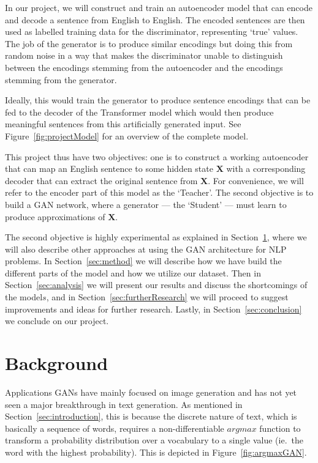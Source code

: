 \documentclass{article}
\begin{document}
In our project, we will construct and train an autoencoder model that can encode
and decode a sentence from English to English. The encoded sentences are then
used as labelled training data for the discriminator, representing `true'
values. The job of the generator is to produce similar encodings but doing this
from random noise in a way that makes the discriminator unable to distinguish
between the encodings stemming from the autoencoder and the encodings stemming
from the generator.

Ideally, this would train the generator to produce sentence encodings that can
be fed to the decoder of the Transformer model which would then produce
meaningful sentences from this artificially generated input. See
Figure~\ref{fig:projectModel} for an overview of the complete model.

This project thus have two objectives: one is to construct a working autoencoder
that can map an English sentence to some hidden state $\mathbf{X}$ with a
corresponding decoder that can extract the original sentence from $\mathbf{X}$.
For convenience, we will refer to the encoder part of this model as the
`Teacher'. The second objective is to build a GAN network, where a generator ---
the `Student' --- must learn to produce approximations of $\mathbf{X}$.

The second objective is highly experimental as explained in
Section~\ref{sec:background}, where we will also describe other approaches at
using the GAN architecture for NLP problems. In Section~\ref{sec:method} we will
describe how we have build the different parts of the model and how we utilize
our dataset. Then in Section~\ref{sec:analysis} we will present our results and
discuss the shortcomings of the model\(s\), and in
Section~\ref{sec:furtherResearch} we will proceed to suggest improvements and
ideas for further research. Lastly, in Section~\ref{sec:conclusion} we conclude
on our project.


\section{Background}\label{sec:background}

Applications GANs have mainly focused on image generation and has not yet seen a
major breakthrough in text generation. As mentioned in
Section~\ref{sec:introduction}, this is because the discrete nature of text,
which is basically a sequence of words, requires a non-differentiable $argmax$
function to transform a probability distribution over a vocabulary to a single
value (ie.\ the word with the highest probability). This is depicted in
Figure~\ref{fig:argmaxGAN}.
\end{document}
